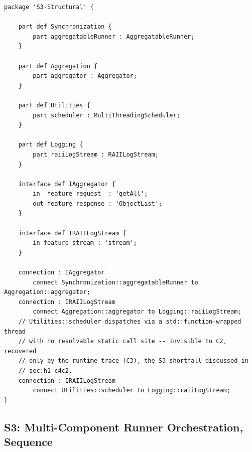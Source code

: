 \begin{verbatim}
package 'S3-Structural' {

    part def Synchronization {
        part aggregatableRunner : AggregatableRunner;
    }

    part def Aggregation {
        part aggregator : Aggregator;
    }

    part def Utilities {
        part scheduler : MultiThreadingScheduler;
    }

    part def Logging {
        part raiiLogStream : RAIILogStream;
    }

    interface def IAggregator {
        in  feature request  : 'getAll';
        out feature response : 'ObjectList';
    }

    interface def IRAIILogStream {
        in feature stream : 'stream';
    }

    connection : IAggregator
        connect Synchronization::aggregatableRunner to Aggregation::aggregator;
    connection : IRAIILogStream
        connect Aggregation::aggregator to Logging::raiiLogStream;
    // Utilities::scheduler dispatches via a std::function-wrapped thread
    // with no resolvable static call site -- invisible to C2, recovered
    // only by the runtime trace (C3), the S3 shortfall discussed in
    // sec:h1-c4c2.
    connection : IRAIILogStream
        connect Utilities::scheduler to Logging::raiiLogStream;
}
\end{verbatim}

\subsection{S3: Multi-Component Runner Orchestration, Sequence}

